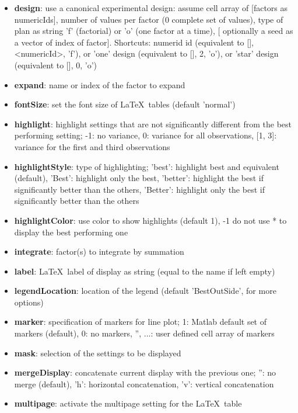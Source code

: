 \documentclass[a4paper,fleqn]{tufte-handout}
\newcommand{\latex}{\LaTeX\ }
\begin{document}
\begin{itemize}
\item \textbf{design}: use a canonical experimental design: assume cell array of {[factors as numericIds], number of values per factor (0 complete set of values), type of plan as string 'f' (factorial) or 'o' (one factor at a time), [ optionally a seed as a vector of index of factor]}. Shortcuts: numerid id (equivalent to {[], <numericId>}, 'f'), or 'one' design (equivalent to {[], 2, 'o'}), or 'star' design (equivalent to {[], 0, 'o'})
\item \textbf{expand}: name or index of the factor to expand                 
\item \textbf{fontSize}:  set the font size of \latex tables (default 'normal')                
\item \textbf{highlight}:  highlight settings that are not significantly
    	different from the best performing setting;
       -1: no variance,
    	0: variance for all observations,
    	[1, 3]: variance for the first and third observations 
\item \textbf{highlightStyle}:  type of highlighting;
        'best': highlight best and equivalent (default),
        'Best': highlight only the best,
        'better': highlight the best if significantly better than
           the others,
        'Better': highlight only the best if significantly better than
           the others               
\item \textbf{highlightColor}: use color to show highlights (default 1), -1 do
       not use * to display the best performing one                 
\item \textbf{integrate}:  factor(s) to integrate by summation 
\item \textbf{label}: \latex label of display as string (equal to the name if left empty)             
\item \textbf{legendLocation}: location of the legend (default 'BestOutSide',  for more options)
\item \textbf{marker}:  specification of markers for line plot;
           1: Matlab default set of markers (default),
           0: no markers,
           {'', ...}: user defined cell array of markers 
\item \textbf{mask}: selection of the settings to be displayed
\item \textbf{mergeDisplay}: concatenate current display with the previous one;
        '': no merge (default),
        'h': horizontal concatenation,
        'v': vertical concatenation                 
\item \textbf{multipage}: activate the multipage setting for the \latex table 

\end{itemize}
\end{document}
